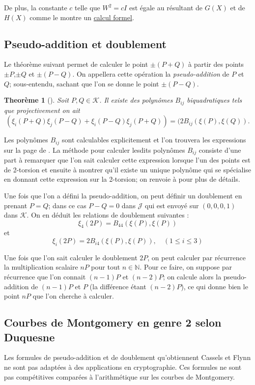 \documentclass[a4paper,12pt]{article}
\newtheorem{theoreme}{Theorème}[section]
\theoremstyle{definition}
\theoremstyle{remark}
\numberwithin{equation}{section}
\begin{document}
De plus, la constante $c$ telle que $W^2 = cI$ est égale au résultant de $G(X)$ et de $H(X)$ comme le montre un \href{run:./add2tors.sag}{calcul formel}.

\subsection{Pseudo-addition et doublement}
Le théorème suivant permet de calculer le point $\pm (P+Q)$ à partir des points $\pm P$,$\pm Q$ et $\pm(P-Q)$. On appellera cette opération la \emph{pseudo-addition} de $P$ et $Q$; sous-entendu, sachant que l'on se donne le point $\pm(P-Q)$.

\begin{theoreme}[\citet{cassels-Flynn}]
Soit $P,Q \in \mathcal{K}$. Il existe des polynômes $B_{ij}$ biquadratiques tels que projectivement on ait
$$(\xi_i(P+Q)\xi_j(P-Q) + \xi_i(P-Q)\xi_j(P+Q)) = (2B_{ij}(\xi(P),\xi(Q)).$$
\end{theoreme}

Les polynômes $B_{ij}$ sont calculables explicitement et l'on trouvera les expressions sur la page de \citet{biquad}. La méthode pour calculer lesdits polynômes $B_{ij}$ consiste d'une part à remarquer que l'on sait calculer cette expression lorsque l'un des points est de 2-torsion et ensuite à montrer qu'il existe un unique polynôme qui se spécialise en donnant cette expression sur la 2-torsion; on renvoie à \citep{cassels-Flynn} pour plus de détails.

Une fois que l'on a défini la pseudo-addition, on peut définir un doublement en prenant $P=Q$; dans ce cas $P-Q = 0$ dans $\mathcal{J}$ qui est envoyé sur $(0,0,0,1)$ dans $\mathcal{K}$. On en déduit les relations de doublement suivantes :
$$\xi_4(2P) = B_{44}(\xi(P),\xi(P))$$
et
$$\xi_i(2P) = 2B_{i4}(\xi(P),\xi(P)), \quad (1\leq i \leq 3)$$

Une fois que l'on sait calculer le doublement $2P$, on peut calculer par récurrence la multiplication scalaire $nP$ pour tout $n\in\mathbb{N}$. Pour ce faire, on suppose par récurrence que l'on connait $(n-1)P$ et $(n-2)P$; on calcule alors la pseudo-addition de $(n-1)P$ et $P$ (la différence étant $(n-2)P$), ce qui donne bien le point $nP$ que l'on cherche à calculer.

\subsection{Courbes de Montgomery en genre 2 selon Duquesne}
Les formules de pseudo-addition et de doublement qu'obtiennent Cassels et Flynn ne sont pas adaptées à des applications en cryptographie. Ces formules ne sont pas compétitives comparées à l'arithmétique sur les courbes de Montgomery.
\end{document}
